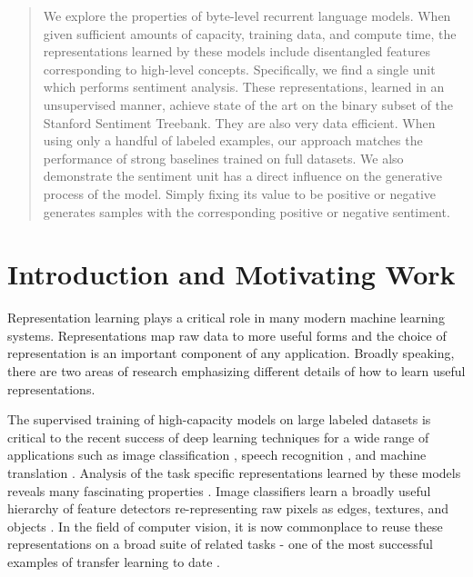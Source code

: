 \documentclass{article}
\begin{document}
 



\printAffiliationsAndNotice{}

\begin{abstract}
We explore the properties of byte-level recurrent language models. When given sufficient amounts of capacity, training data, and compute time, the representations learned by these models include disentangled features corresponding to high-level concepts. Specifically, we find a single unit which performs sentiment analysis. These representations, learned in an unsupervised manner, achieve state of the art on the binary subset of the Stanford Sentiment Treebank. They are also very data efficient. When using only a handful of labeled examples, our approach matches the performance of strong baselines trained on full datasets. We also demonstrate the sentiment unit has a direct influence on the generative process of the model. Simply fixing its value to be positive or negative generates samples with the corresponding positive or negative sentiment.
\end{abstract}

\section{Introduction and Motivating Work}
Representation learning \cite{bengio2013representation} plays a critical role in many modern machine learning systems. Representations map raw data to more useful forms and the choice of representation is an important component of any application. Broadly speaking, there are two areas of research emphasizing different details of how to learn useful representations. 

The supervised training of high-capacity models on large labeled datasets is critical to the recent success of deep learning techniques for a wide range of applications such as image classification \cite{krizhevsky2012imagenet}, speech recognition \cite{hinton2012deep}, and machine translation \cite{wu2016google}. Analysis of the task specific representations learned by these models reveals many fascinating properties \cite{zhou2014object}. Image classifiers learn a broadly useful hierarchy of feature detectors re-representing raw pixels as edges, textures, and objects \cite{zeiler2014visualizing}. In the field of computer vision, it is now commonplace to reuse these representations on a broad suite of related tasks - one of the most successful examples of transfer learning to date \cite{oquab2014learning}.
\end{document}
